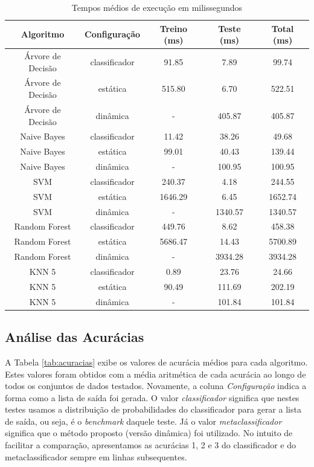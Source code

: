 \begin{table}[h!]
  \begin{center}
    \resizebox{\textwidth}{!} {
    \begin{tabular}{ccccc}
      \hline
      \textbf{Algoritmo} & \textbf{Configuração} & \textbf{Treino (ms)} & \textbf{Teste (ms)} & \textbf{Total (ms)}\\
      \hline

      Árvore de Decisão & classificador & 91.85 & 7.89 & 99.74\\
      Árvore de Decisão & estática & 515.80 & 6.70 & 522.51\\
      Árvore de Decisão & dinâmica & - & 405.87 & 405.87\\
      Naive Bayes &  classificador & 11.42 & 38.26 & 49.68\\
      Naive Bayes &  estática & 99.01 & 40.43 & 139.44\\
      Naive Bayes &  dinâmica & - & 100.95 & 100.95\\
      SVM & classificador & 240.37 & 4.18 & 244.55\\
      SVM & estática & 1646.29 & 6.45 & 1652.74\\
      SVM & dinâmica & - & 1340.57 & 1340.57\\
      Random Forest &  classificador & 449.76 & 8.62 & 458.38\\
      Random Forest &  estática & 5686.47 & 14.43 & 5700.89\\
      Random Forest &  dinâmica & - & 3934.28 & 3934.28\\
      KNN 5 & classificador & 0.89 & 23.76 & 24.66\\
      KNN 5 & estática  & 90.49 & 111.69  & 202.19\\
      KNN 5 & dinâmica  & - & 101.84 & 101.84\\

      \hline
    \end{tabular}
    }
    \caption{Tempos médios de execução em milissegundos}
    \label{tab:tempostestes}
  \end{center}
\end{table}

\subsection{Análise das Acurácias}

A Tabela \ref{tab:acuracias} exibe os valores de acurácia médios para cada algoritmo. 
Estes valores foram obtidos com a média aritmética de cada acurácia ao longo de todos os conjuntos de dados testados.
Novamente, a coluna \textit{Configuração} indica a forma como a lista de saída foi gerada. 
O valor \textit{classificador} significa que nestes testes usamos a distribuição de probabilidades do classificador para gerar a lista de saída, ou seja, é o \textit{benchmark} daquele teste.
Já o valor \textit{metaclassificador} significa que o método proposto (versão dinâmica) foi utilizado.
No intuito de facilitar a comparação, apresentamos as acurácias 1, 2 e 3 do classificador e do metaclassificador sempre em linhas subsequentes.

